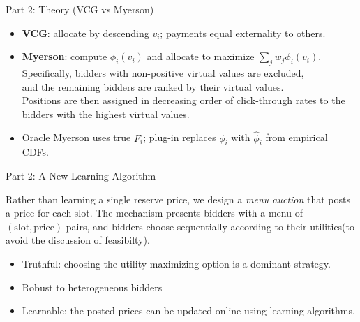 \documentclass{beamer}
\begin{document}
\begin{frame}{Part 2: Theory (VCG vs Myerson)}
  \begin{itemize}
    \item \textbf{VCG}: allocate by descending $v_i$; payments equal externality to others.\vspace{1mm}
    \item \textbf{Myerson}: compute $\phi_i(v_i)$ and allocate to maximize 
      $\sum_j w_j \phi_i(v_i)$. 
      {\footnotesize Specifically, bidders with non-positive virtual values are excluded, \\
      and the remaining bidders are ranked by their virtual values.\\
      Positions are then assigned in decreasing order of click-through rates to
      the bidders with the highest virtual values.}
    \item Oracle Myerson uses true $F_i$; plug-in replaces $\phi_i$ with $\hat\phi_i$ from empirical CDFs.
  \end{itemize}
\end{frame}

\begin{frame}{Part 2: A New Learning Algorithm}

Rather than learning a single reserve price,  
we design a \emph{menu auction} that posts a price for each slot.  
The mechanism presents bidders with a menu of $(\text{slot}, \text{price})$ pairs,  
and bidders choose sequentially according to their utilities(to avoid the discussion of feasibilty).

\medskip
\begin{itemize}
  \item Truthful: choosing the utility-maximizing option is a dominant strategy.
  \item Robust to heterogeneous bidders
  \item Learnable: the posted prices can be updated online using learning algorithms.
\end{itemize}

\end{frame}
\end{document}
